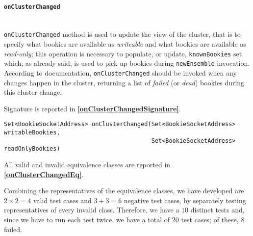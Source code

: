 \documentclass[sigconf]{acmart}
\begin{document}
\paragraph{\texttt{onClusterChanged}}
\hfill\\
\texttt{onClusterChanged} method is used to update the view of the cluster, that is to specify what bookies are available as \textit{writeable} and what bookies are available as \textit{read-only}; this operation is necessary to populate, or update, \texttt{knownBookies} set which, as already said, is used to pick up bookies during \texttt{newEnsemble} invocation. According to documentation, \texttt{onClusterChanged} should be invoked when any changes happen in the cluster, returning a list of \textit{failed} (or \textit{dead}) bookies during this cluster change. 

Signature is reported in \textbf{\cref{onClusterChangedSignature}}.

\begin{lstlisting}[frame=lines,basicstyle=\ttfamily\tiny, caption={Signature of method \texttt{onClusterChanged}}, label={onClusterChangedSignature}]
Set<BookieSocketAddress> onClusterChanged(Set<BookieSocketAddress> writableBookies,
                                          Set<BookieSocketAddress> readOnlyBookies)
\end{lstlisting}

All valid and invalid equivalence classes are reported in \textbf{\cref{onClusterChangedEq}}.

Combining the representatives of the equivalence classes, we have developed are $2 \times 2  = 4$ valid test cases and $3 + 3 = 6$ negative test cases, by separately testing representatives of every invalid class. Therefore, we have a $10$ distinct tests and, since we have to run each test twice, we have a total of $20$ test cases; of these, $8$ failed. 
\end{document}

